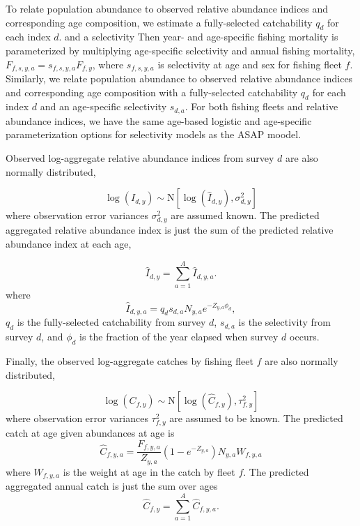 \documentclass[12pt,letterpaper, leqno]{article}
\begin{document}
To relate population abundance to observed relative abundance indices and corresponding age composition, we estimate a fully-selected catchability $q_{d}$ for each index $d$. and a selectivity
Then year- and age-specific fishing mortality is parameterized by multiplying age-specific selectivity and annual fishing mortality, $ F_{f,s,y,a} = s_{f,s,y,a} F_{f,y}$, where $s_{f,s,y,a}$ is selectivity at age and sex for fishing fleet $f$. Similarly, we relate population abundance to observed relative abundance indices and corresponding age composition with a fully-selected catchability $q_{d}$ for each index $d$ and an age-specific selectivity $s_{d,a}$. For both fishing fleets and relative abundance indices, we have the same age-based logistic and age-specific parameterization options for selectivity models as the ASAP moodel.

Observed log-aggregate relative abundance indices from survey $d$ are also normally distributed,

\vspace{-12pt}
\begin{equation*}
 \log\left(I_{d,y}\right) \sim \text{N}\left[\log\left(\widehat I_{d,y}\right), \sigma^2_{d,y}\right]
\end{equation*}
where observation error variances $\sigma^2_{d,y}$ are assumed known. The predicted aggregated relative abundance index is just the sum of the predicted relative abundance index at each age,

\vspace{-12pt}
\begin{equation*}
\widehat I_{d,y} = \sum^A_{a=1} \widehat I_{d,y,a}.
\end{equation*}
where
\vspace{-12pt}
\begin{equation*}
\widehat I_{d,y,a} = q_d s_{d,a} N_{y,a} e^{- Z_{y,a} \phi_d}, 
\end{equation*}
$q_d$ is the fully-selected catchability from survey $d$, $s_{d,a}$ is the selectivity from survey $d$, and $\phi_d$ is the fraction of the year elapsed when survey $d$ occurs. 

Finally, the observed log-aggregate catches by fishing fleet $f$ are also normally distributed,

\vspace{-12pt}
\begin{equation*}
\log\left(C_{f,y}\right) \sim \text{N}\left[\log\left(\widehat C_{f,y}\right), \tau^2_{f,y}\right]
\end{equation*}
where observation error variances $\tau^2_{f,y}$ are assumed to be known. The predicted catch at age given abundances at age is
\begin{equation}\label{pred.caa}
\widehat C_{f,y,a} = \frac{F_{f,y,a}}{Z_{y,a}}\left(1 - e^{-Z_{y,a}}\right) N_{y,a} W_{f,y,a}
\end{equation}
where $W_{f,y,a}$ is the weight at age in the catch by fleet $f$. The predicted aggregated annual catch is just the sum over ages
\begin{equation}\label{pred.catch}
\widehat C_{f,y} = \sum^A_{a=1} \widehat C_{f,y,a}.
\end{equation}
\end{document}
